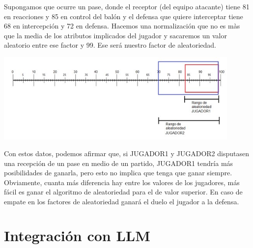 \documentclass{article}
\begin{document}
Supongamos que ocurre un pase, donde el receptor (del equipo atacante) tiene 81 en reacciones y 85 en control del balón y el defensa que quiere interceptar tiene 68 en intercepción y 72 en defensa. Hacemos una normalización que no es màs que la media de los atributos implicados del jugador y sacaremos un valor aleatorio entre ese factor y 99. Ese será nuestro factor de aleatoriedad.


\includegraphics*[width=0.9\textwidth]{rank.jpg}
\bigskip

Con estos datos, podemos afirmar que, si JUGADOR1 y JUGADOR2 disputasen una
recepción de un pase en medio de un partido, JUGADOR1 tendría más posibilidades de
ganarla, pero esto no implica que tenga que ganar siempre.
Obviamente, cuanta más diferencia hay entre los valores de los jugadores, más fácil es
ganar el algoritmo de aleatoriedad para el de valor superior. En caso de empate en los factores de aleatoriedad ganará el duelo el jugador a la defensa.

\section{Integración con LLM}
\end{document}
